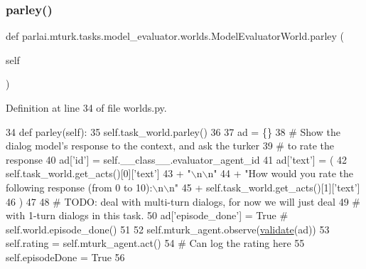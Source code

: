 \subsubsection{\texorpdfstring{parley()}{parley()}}
{\footnotesize\ttfamily def parlai.\+mturk.\+tasks.\+model\+\_\+evaluator.\+worlds.\+Model\+Evaluator\+World.\+parley (\begin{DoxyParamCaption}\item[{}]{self }\end{DoxyParamCaption})}



Definition at line 34 of file worlds.\+py.


\begin{DoxyCode}
34     \textcolor{keyword}{def }parley(self):
35         self.task\_world.parley()
36 
37         ad = \{\}
38         \textcolor{comment}{# Show the dialog model's response to the context, and ask the turker}
39         \textcolor{comment}{# to rate the response}
40         ad[\textcolor{stringliteral}{'id'}] = self.\_\_class\_\_.evaluator\_agent\_id
41         ad[\textcolor{stringliteral}{'text'}] = (
42             self.task\_world.get\_acts()[0][\textcolor{stringliteral}{'text'}]
43             + \textcolor{stringliteral}{"\(\backslash\)n\(\backslash\)n"}
44             + \textcolor{stringliteral}{"How would you rate the following response (from 0 to 10):\(\backslash\)n\(\backslash\)n"}
45             + self.task\_world.get\_acts()[1][\textcolor{stringliteral}{'text'}]
46         )
47 
48         \textcolor{comment}{# TODO: deal with multi-turn dialogs, for now we will just deal}
49         \textcolor{comment}{# with 1-turn dialogs in this task.}
50         ad[\textcolor{stringliteral}{'episode\_done'}] = \textcolor{keyword}{True}  \textcolor{comment}{# self.world.episode\_done()}
51 
52         self.mturk\_agent.observe(\hyperlink{namespaceparlai_1_1core_1_1worlds_afc3fad603b7bce41dbdc9cdc04a9c794}{validate}(ad))
53         self.rating = self.mturk\_agent.act()
54         \textcolor{comment}{# Can log the rating here}
55         self.episodeDone = \textcolor{keyword}{True}
56 
\end{DoxyCode}
\mbox{\label{classparlai_1_1mturk_1_1tasks_1_1model__evaluator_1_1worlds_1_1ModelEvaluatorWorld_a4795df492ce6d443379cd5f28671d3bf}} 
